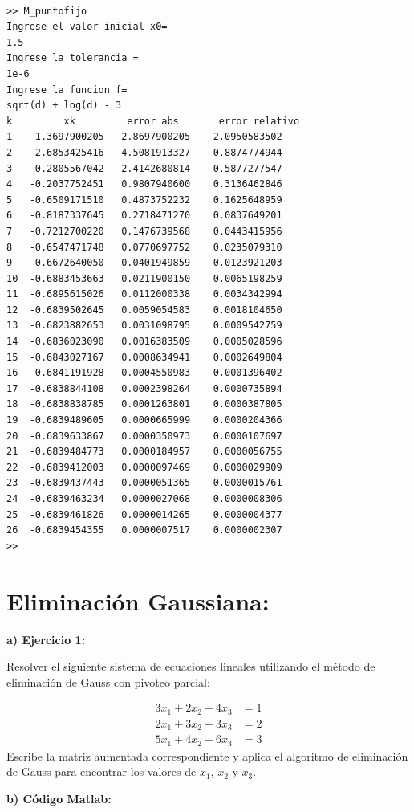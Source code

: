 \documentclass[12pt,a4paper,twoside]{article}  %
\begin{document}
\begin{verbatim}

>> M_puntofijo
Ingrese el valor inicial x0= 
1.5
Ingrese la tolerancia = 
1e-6
Ingrese la funcion f= 
sqrt(d) + log(d) - 3
k         xk         error abs       error relativo
1	-1.3697900205	2.8697900205	2.0950583502
2	-2.6853425416	4.5081913327	0.8874774944
3	-0.2805567042	2.4142680814	0.5877277547
4	-0.2037752451	0.9807940600	0.3136462846
5	-0.6509171510	0.4873752232	0.1625648959
6	-0.8187337645	0.2718471270	0.0837649201
7	-0.7212700220	0.1476739568	0.0443415956
8	-0.6547471748	0.0770697752	0.0235079310
9	-0.6672640050	0.0401949859	0.0123921203
10	-0.6883453663	0.0211900150	0.0065198259
11	-0.6895615026	0.0112000338	0.0034342994
12	-0.6839502645	0.0059054583	0.0018104650
13	-0.6823882653	0.0031098795	0.0009542759
14	-0.6836023090	0.0016383509	0.0005028596
15	-0.6843027167	0.0008634941	0.0002649804
16	-0.6841191928	0.0004550983	0.0001396402
17	-0.6838844108	0.0002398264	0.0000735894
18	-0.6838838785	0.0001263801	0.0000387805
19	-0.6839489605	0.0000665999	0.0000204366
20	-0.6839633867	0.0000350973	0.0000107697
21	-0.6839484773	0.0000184957	0.0000056755
22	-0.6839412003	0.0000097469	0.0000029909
23	-0.6839437443	0.0000051365	0.0000015761
24	-0.6839463234	0.0000027068	0.0000008306
25	-0.6839461826	0.0000014265	0.0000004377
26	-0.6839454355	0.0000007517	0.0000002307
>> 

\end{verbatim}


\section{Eliminación Gaussiana: }

\textbf{a) Ejercicio 1: }

Resolver el siguiente sistema de ecuaciones lineales utilizando el método de eliminación de Gauss con pivoteo parcial:

\[
\begin{aligned}
3x_1 + 2x_2 + 4x_3 &= 1 \\
2x_1 + 3x_2 + 3x_3 &= 2 \\
5x_1 + 4x_2 + 6x_3 &= 3
\end{aligned}
\]
Escribe la matriz aumentada correspondiente y aplica el algoritmo de eliminación de Gauss para encontrar los valores de \( x_1 \), \( x_2 \) y \( x_3 \).




\textbf{b) Código Matlab:}
\end{document}
